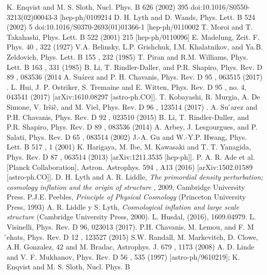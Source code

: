 \documentclass[amssymb,twocolumn,prd,nofootinbib,showpacs]{revtex4-1}
\begin{document}
\begin{thebibliography}{9}
K. Enqvist and M. S. Sloth, Nucl. Phys. B
626
(2002) 395 doi:10.1016/S0550-3213(02)00043-3
[hep-ph/0109214
D. H. Lyth and D. Wands, Phys. Lett. B
524
(2002) 5 doi:10.1016/S0370-2693(01)01366-1
[hep-ph/0110002
 T. Moroi and T. Takahashi, Phys. Lett. B
522
(2001) 215 [hep-ph/0110096]
  E. Madelung, Zeit. F. Phys.
40
, 322 (1927)
  V.A.  Belinsky,  L.P.  Grishchuk,  I.M.  Khalatnikov,  and
Ya.B. Zeldovich, Phys. Lett. B
155
, 232 (1985)
  T.  Piran  and  R.M.  Williams,  Phys.  Lett.  B
163
,  331
(1985)
  B. Li, T. Rindler-Daller, and P.R. Shapiro, Phys. Rev.
D
89
, 083536 (2014
 A. Suárez and P. H. Chavanis,
Phys. Rev. D
95
, 063515
(2017)
.
 L.  Hui,  J.  P.  Ostriker,  S.  Tremaine  and  E.  Witten,  Phys.  Rev.  D
95
,  no.  4,  043541  (2017)
[arXiv:1610.08297 [astro-ph.CO]].
T. Kobayashi, R. Murgia, A. De Simone, V. Ir\~si\~c, and M.
Viel,
Phys. Rev. D
96
, 123514 (2017)
.
 A. Su ́arez and P.H. Chavanis, Phys. Rev. D
92
, 023510
(2015)
  B. Li, T. Rindler-Daller, and P.R. Shapiro, Phys. Rev.
D
89
, 083536 (2014)
  A. Arbey, J. Lesgourgues, and P. Salati, Phys. Rev. D
65
, 083514 (2002)
  J.-A.  Gu  and  W.-Y.P.  Hwang,  Phys.  Lett.  B
517
,  1
(2001)
     K. Harigaya, M. Ibe, M. Kawasaki and T. T. Yanagida, Phys. Rev. D
87
, 063514
(2013) [arXiv:1211.3535 [hep-ph]].
  P.   A.   R.   Ade
et   al.
[Planck   Collaboration],    Astron.   Astrophys.
594
,    A13   (2016)
[arXiv:1502.01589 [astro-ph.CO]].
D. H. Lyth and A. R. Liddle, \textit{The primordial density perturbation; cosmology inflation and the origin of structure} , 2009, Cambridge University Press.
P.J.E. Peebles, \textit{Principle of Physical Cosmology} (Princeton University Press, 1993)
A. R. Liddle y S. Lyth, \textit{Cosmological inflation and large scale structure} (Cambridge University Press, 2000).
L. Husdal, (2016), 1609.04979.
L. Visinelli,
Phys. Rev. D 96, 023013 (2017).
  P.H. Chavanis, M. Lemou, and F. M ́ehats, Phys. Rev.
D
12
, 123527 (2015)
  S.W. Randall, M. Markevitch, D. Clowe, A.H. Gonzalez,
42
and M. Bradac, Astrophys. J.
679
, 1173 (2008)
 A. D. Linde and V. F. Mukhanov, Phys. Rev. D
56
, 535 (1997) [astro-ph/9610219];
K.  Enqvist  and  M.  S.  Sloth,  Nucl.  Phys.  B

\end{thebibliography}
\end{document}
